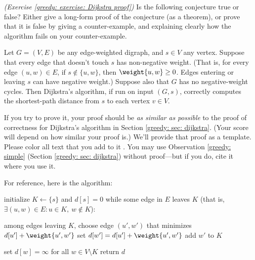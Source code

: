 \documentclass[11pt]{article}
\begin{document}


\newpage
\problem \emph{(Exercise \ref{greedy: exercise: Dijkstra proof})}
Is the following conjecture true or false?
Either give a long-form proof of the conjecture (as a theorem),
or prove that it is false by giving a counter-example,
and explaining clearly how the algorithm fails on your counter-example.

\begin{conjecture}\label{dijkstra 2}
  Let $G=(V,E)$ be any edge-weighted digraph, and $s\in V$ any vertex.
  Suppose that every edge that doesn't touch $s$ has non-negative weight.
  (That is, for every edge $(u,w)\in E$, if $s\not\in \{u,w\}$, then $\weight {u,w} \ge 0$.
  Edges entering or leaving $s$ can have negative weight.)
  Suppose also that $G$ has no negative-weight cycles. 
  Then Dijkstra's algorithm, if run on input $(G,s)$,
  correctly computes the shortest-path distance from $s$ to each vertex $v\in V$.
\end{conjecture}

If you try to prove it, your proof should be \emph{as similar as possible}
to the proof of correctness for Dijkstra's algorithm in Section \ref{greedy: sec: dijkstra}.
(Your score will depend on how similar your proof is.)
We'll provide that proof as a template.
Please color all text that you add to it .
You may use Observation \ref{greedy: simple} (Section \ref{greedy: sec: dijkstra}) without proof---but if you do, cite it where you use it.

\bigskip

For reference, here is the algorithm:

\begin{samepage}
  \begin{myframed}
    \begin{steps}
    \item[$\textsf{Dijkstra}\big(G=(V,E), s\big)$:]
      \step initialize $K \leftarrow \{s\}$ and $d[s] = 0$
      \step[loop] while some edge in $E$ leaves $K$
      (that is, $\exists (u,w) \in E: u\in K,~w\not\in K$):
      \begin{block}
        \step among edges leaving $K$,
        choose edge $(u',w')$ that minimizes $d[u'] + \weight {u', w'}$
        \step set $d[w'] = d[u'] + \weight {u', w'}$
        \step add $w'$ to $K$
      \end{block}
      \step\label{unreachable}
      set $d[w] = \infty$ for all $w\in V\setminus K$
      \step return $d$
    \end{steps}
  \end{myframed}
\end{samepage}
\end{document}

